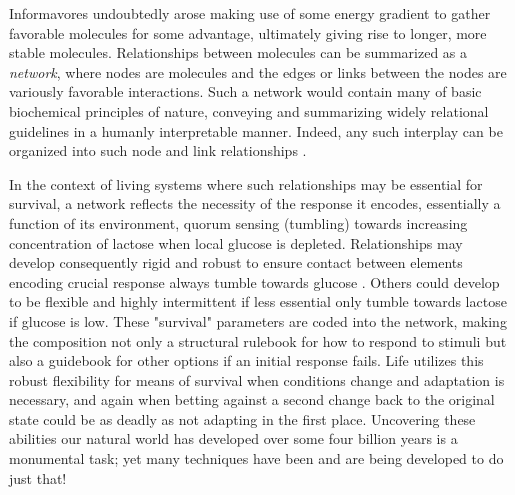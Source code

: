 Informavores undoubtedly arose making use of some energy gradient to gather favorable molecules for some advantage, ultimately giving rise to longer, more stable molecules. Relationships between molecules can be summarized as a \emph{network}, where nodes are molecules and the edges or links between the nodes are variously favorable interactions. Such a network would contain many of basic biochemical principles of nature, conveying and summarizing widely relational guidelines in a humanly interpretable manner. Indeed, any such interplay can be organized into such node and link relationships \citep{barabasi2004network}.

In the context of living systems where such relationships may be essential for survival, a network reflects the necessity of the response it encodes, essentially a function of its environment, \eg \coli quorum sensing (tumbling) towards increasing concentration of lactose when local glucose is depleted. Relationships may develop consequently rigid and robust to ensure contact between elements encoding crucial response \eg always tumble towards glucose \citep{berg2000motile}. Others could develop to be flexible and highly intermittent if less essential \eg only tumble towards lactose if glucose is low.
These "survival" parameters are coded into the network, making the composition not only a structural rulebook for how to respond to stimuli but also a guidebook for other options if an initial response fails. Life utilizes this robust flexibility for means of survival when conditions change and adaptation is necessary, and again when betting against a second change back to the original state could be as deadly as not adapting in the first place. Uncovering these abilities our natural world has developed over some four billion years is a monumental task; yet many techniques have been and are being developed to do just that!

